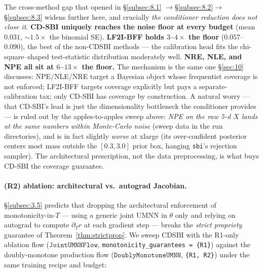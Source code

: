 \documentclass[11pt]{article}
\begin{document}
The cross-method gap that opened in \S\ref{subsec:8.1}
\(\to\)\S\ref{subsec:8.2}\(\to\)\S\ref{subsec:8.3} widens further here,
and crucially \emph{the conditioner reduction does not close it}.
\textbf{CD-SBI uniquely reaches the noise floor at every budget} (mean
\(0.031\), \(\sim 1.5\times\) the binomial SE). \textbf{LF2I-BFF holds
\(3\)--\(4\times\) the floor} (\(0.057\)--\(0.090\)), the best of the
non-CDSBI methods --- the calibration head fits the chi-square--shaped
test-statistic distribution moderately well. \textbf{NRE, NLE, and NPE
all sit at \(6\)--\(13\times\) the floor.} The mechanism is the same
one \S\ref{sec:10} discusses: NPE/NLE/NRE target a Bayesian object
whose frequentist coverage is not enforced; LF2I-BFF targets coverage
explicitly but pays a separate-calibration tax; only CD-SBI has
coverage by construction. A natural worry --- that CD-SBI's lead is
just the dimensionality bottleneck the conditioner provides --- is
ruled out by the apples-to-apples sweep above: \emph{NPE on the raw
5-d \(X\) lands at the same numbers within Monte-Carlo noise} (sweep
data in the run directories), and is in fact slightly \emph{worse} at
xlarge (its over-confident posterior centers most mass outside the
\([0.3, 3.0]\) prior box, hanging \texttt{sbi}'s rejection sampler).
The architectural prescription, not the data preprocessing, is what
buys CD-SBI the coverage guarantee.

\paragraph{(R2) ablation: architectural vs.\ autograd Jacobian.}
\S\ref{subsec:3.5} predicts that dropping the architectural enforcement
of monotonicity-in-\(T\) --- using a generic joint UMNN in \(\theta\)
only and relying on autograd to compute \(\partial_T r\) at each
gradient step --- breaks the \emph{strict propriety} guarantee of
Theorem~\ref{thm:strictprop}. We sweep CDSBI with the R1-only ablation
flow (\(\mathtt{JointUMNNFlow}\), \texttt{monotonicity\_guarantees =
\{R1\}}) against the doubly-monotone production flow
(\(\mathtt{DoublyMonotoneUMNN}\), \texttt{\{R1, R2\}}) under the same
training recipe and budget:
\end{document}
